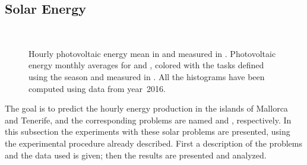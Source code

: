 \subsection{Solar Energy}

\begin{figure}[t!]
    \centering%
    \quad%
    \\
    \quad%
 \caption{\label{fig:solar_task_def}Hourly photovoltaic energy mean {in}  {and}  measured in \mwhu{}. Photovoltaic energy monthly averages for  and , colored with the tasks defined using the season and measured in \mwhu{}. All the histograms have been computed using data from year~2016.}
 \end{figure}

The goal is to predict the hourly energy production in the islands of Mallorca and Tenerife, and the corresponding problems are named  and , respectively. 
%
In this subsection the experiments with these solar problems are presented, using the experimental procedure already described. First a description of the problems and the data used is given; then the results are presented and analyzed.

